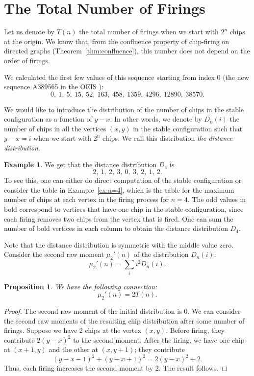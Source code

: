 \documentclass[11pt]{article}
\newtheorem{proposition}[theorem]{Proposition}
\theoremstyle{definition}
\newtheorem{example}{Example}
\theoremstyle{remark}
\begin{document}
\section{The Total Number of Firings}\label{sec:TotalFirings}

Let us denote by $T(n)$ the total number of firings when we start with $2^n$ chips at the origin. We know that, from the confluence property of chip-firing on directed graphs (Theorem~\ref{thm:confluence}), this number does not depend on the order of firings.

We calculated the first few values of this sequence starting from index 0 (the new sequence A389565 in the OEIS \cite{oeis}):
\[0,\ 1,\ 5,\ 15,\ 52,\ 163,\ 458,\ 1359,\ 4296,\ 12890,\ 38570.\]

We would like to introduce the distribution of the number of chips in the stable configuration as a function of $y-x$. In other words, we denote by $D_n(i)$ the number of chips in all the vertices $(x,y)$ in the stable configuration such that $y-x = i$ when we start with $2^n$ chips. We call this distribution \textit{the distance distribution}.

\begin{example}
\label{ex:n=4D}
    We get that the distance distribution $D_4$ is
    \[2,\ 1,\ 2,\ 3,\ 0,\ 3,\ 2,\ 1,\ 2.\] To see this, one can either do direct computation of the stable configuration or consider the table in Example~\ref{ex:n=4}, which is the table for the maximum number of chips at each vertex in the firing process for $n=4$. The odd values in bold correspond to vertices that have one chip in the stable configuration, since each firing removes two chips from the vertex that is fired. One can sum the number of bold vertices in each column to obtain the distance distribution $D_4$.
\end{example}

Note that the distance distribution is symmetric with the middle value zero. Consider the second raw moment $\mu_2'(n)$ of the distribution $D_n(i)$:
\[\mu_2'(n) = \sum_i i^2D_n(i).\]

\begin{proposition}
    We have the following connection:
    \[\mu_2'(n) = 2T(n).\]
\end{proposition}

\begin{proof}
    The second raw moment of the initial distribution is 0. We can consider the second raw moments of the resulting chip distribution after some number of firings. Suppose we have 2 chips at the vertex $(x,y)$. Before firing, they contribute $2(y-x)^2$ to the second moment. After the firing, we have one chip at $(x+1,y)$ and the other at $(x,y+1)$; they contribute
    \[(y-x-1)^2 + (y-x+1)^2 = 2(y-x)^2 + 2.\]
    Thus, each firing increases the second moment by 2. The result follows.
\end{proof}
\end{document}

